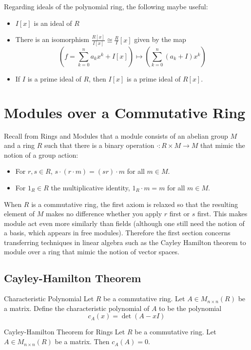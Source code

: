 \documentclass[a4paper]{article}
\begin{document}
Regarding ideals of the polynomial ring, the following maybe useful: 
\begin{itemize}
\item $I[x]$ is an ideal of $R$
\item There is an isomorphism $\frac{R[x]}{I[x]}\cong\frac{R}{I}[x]$ given by the map $$\left(f=\sum_{k=0}^na_kx^k+I[x]\right)\mapsto\left(\sum_{k=0}^n(a_k+I)x^k\right)$$
\item If $I$ is a prime ideal of $R$, then $I[x]$ is a prime ideal of $R[x]$. 
\end{itemize}

\pagebreak
\section{Modules over a Commutative Ring}
Recall from Rings and Modules that a module consists of an abelian group $M$ and a ring $R$ such that there is a binary operation $\cdot:R\times M\to M$ that mimic the notion of a group action: 
\begin{itemize}
\item For $r,s\in R$, $s\cdot(r\cdot m)=(sr)\cdot m$ for all $m\in M$. 
\item For $1_R\in R$ the multiplicative identity, $1_R\cdot m=m$ for all $m\in M$. 
\end{itemize}

When $R$ is a commutative ring, the first axiom is relaxed so that the resulting element of $M$ makes no difference whether you apply $r$ first or $s$ first. This makes module act even more similarly than fields (although one still need the notion of a basis, which appears in free modules). Therefore the first section concerns transferring techniques in linear algebra such as the Cayley Hamilton theorem to module over a ring that mimic the notion of vector spaces. 

\subsection{Cayley-Hamilton Theorem}
\begin{defn}{Characteristic Polynomial}{} Let $R$ be a commutative ring. Let $A\in M_{n\times n}(R)$ be a matrix. Define the characteristic polynomial of $A$ to be the polynomial $$c_A(x)=\det(A-xI)$$
\end{defn}

\begin{thm}{Cayley-Hamilton Theorem for Rings}{} Let $R$ be a commutative ring. Let $A\in M_{n\times n}(R)$ be a matrix. Then $c_A(A)=0$. 
\end{thm}
\end{document}
